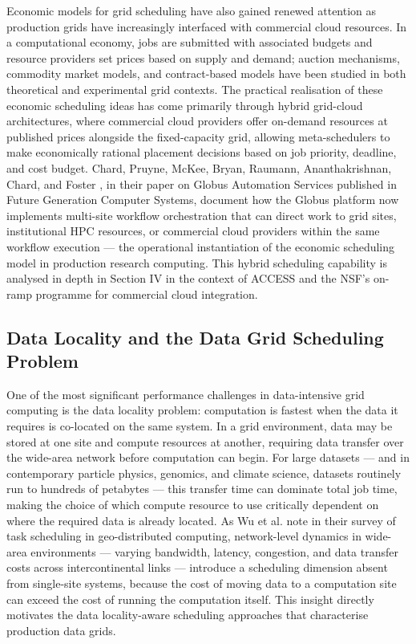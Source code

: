 \documentclass[12pt,a4paper]{report}
\begin{document}
Economic models for grid scheduling have also gained renewed attention as production grids have increasingly interfaced with commercial cloud resources.
 In a computational economy, jobs are submitted with associated budgets and resource providers set prices based on supply and demand; auction mechanisms, 
 commodity market models, and contract-based models have been studied in both theoretical and experimental grid contexts. The practical realisation of
  these economic scheduling ideas has come primarily through hybrid grid-cloud architectures, where commercial cloud providers offer on-demand resources
   at published prices alongside the fixed-capacity grid, allowing meta-schedulers to make economically rational placement decisions based on job priority, 
   deadline, and cost budget. Chard, Pruyne, McKee, Bryan, Raumann, Ananthakrishnan, Chard, and Foster \parencite{chard2023}, in their paper on Globus Automation Services
    published in Future Generation Computer Systems, document how the Globus platform now implements multi-site workflow orchestration that can direct 
    work to grid sites, institutional HPC resources, or commercial cloud providers within the same workflow execution — the operational instantiation of
     the economic scheduling model in production research computing. This hybrid scheduling capability is analysed in depth in Section IV in the context 
     of ACCESS and the NSF’s on-ramp programme for commercial cloud integration.

    \subsection*{Data Locality and the Data Grid Scheduling Problem}
One of the most significant performance challenges in data-intensive grid computing is the data locality problem: computation is fastest when the data it
 requires is co-located on the same system. In a grid environment, data may be stored at one site and compute resources at another, requiring data transfer 
 over the wide-area network before computation can begin. For large datasets — and in contemporary particle physics, genomics, and climate science, datasets 
 routinely run to hundreds of petabytes — this transfer time can dominate total job time, making the choice of which compute resource to use critically 
 dependent on where the required data is already located. As Wu et al. \parencite{wu2025task} note in their survey of task scheduling in geo-distributed computing,
  network-level dynamics in wide-area environments — varying bandwidth, latency, congestion, and data transfer costs across intercontinental 
  links — introduce a scheduling dimension absent from single-site systems, because the cost of moving data to a computation site can exceed the cost of
   running the computation itself. This insight directly motivates the data locality-aware scheduling approaches that characterise production data grids.
\end{document}
